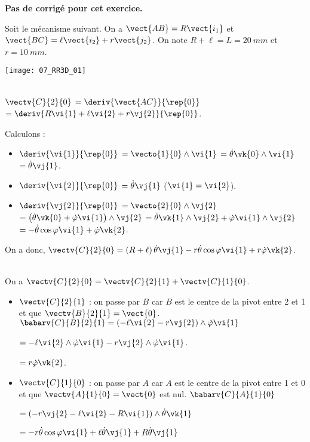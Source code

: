 \normaltrue \difficilefalse \tdifficilefalse
\correctiontrue


\setcounter{numques}{0}
\ifcorrection
\else
\textbf{Pas de corrigé pour cet exercice.}
\fi

\ifprof
\else
Soit le mécanisme suivant. On a $\vect{AB}=R\vect{i_1}$ et $\vect{BC}=\ell\vect{i_2}+r\vect{j_2}$. On note $R+\ell=L = \SI{20}{mm}$ et $r=\SI{10}{mm}$.
\begin{center}
\texttt{[image: 07\_RR3D\_01]}
\end{center}
\fi

\ifprof ~\\
$\vectv{C}{2}{0}$ 
$=\deriv{\vect{AC}}{\rep{0}}$ 
$=\deriv{R\vi{1}+\ell\vi{2}+r\vj{2}}{\rep{0}}$.

Calculons : 
\begin{itemize}
\item $\deriv{\vi{1}}{\rep{0}}$ $=\vecto{1}{0} \wedge \vi{1}$ $=\dot{\theta}\vk{0} \wedge \vi{1}$ $=\dot{\theta}\vj{1}$.
\item $\deriv{\vi{2}}{\rep{0}}$ $=\dot{\theta}\vj{1}$ ($\vi{1}=\vi{2}$).
\item $\deriv{\vj{2}}{\rep{0}}$ $=\vecto{2}{0} \wedge \vj{2}$ 
$=\left(\dot{\theta}\vk{0}+ \dot{\varphi}\vi{1} \right) \wedge \vj{2}$
$=\dot{\theta}\vk{1} \wedge \vj{2}+ \dot{\varphi}\vi{1}  \wedge \vj{2}$
$=-\dot{\theta}\cos\varphi \vi{1} + \dot{\varphi}\vk{2} $.
\end{itemize}

On a donc, 
$\vectv{C}{2}{0}= \left(R+\ell\right)\dot{\theta}\vj{1} -r\dot{\theta}\cos\varphi \vi{1} + r\dot{\varphi}\vk{2}$.
\else
\fi


\ifprof ~\\
On a $\vectv{C}{2}{0}= \vectv{C}{2}{1}+\vectv{C}{1}{0}$.
\begin{itemize}
\item $\vectv{C}{2}{1}$ : on passe par $B$ car $B$ est le centre de la pivot entre 2 et 1 et que $\vectv{B}{2}{1}=\vect{0}$. 
$\babarv{C}{B}{2}{1} =\left(-\ell\vi{2}-r\vj{2} \right)\wedge \dot{\varphi}\vi{1} $ 

$=-\ell\vi{2}\wedge \dot{\varphi}\vi{1}-r\vj{2} \wedge \dot{\varphi}\vi{1}$.

$=r\dot{\varphi}\vk{2}$.

\item $\vectv{C}{1}{0}$ : on passe par $A$ car $A$ est le centre de la pivot entre 1 et 0 et que $\vectv{A}{1}{0}=\vect{0}$ est nul. 
$\babarv{C}{A}{1}{0}$ 

$=\left(-r\vj{2}-\ell\vi{2}-R\vi{1}\right)\wedge \dot{\theta}\vk{1}$

$=-r\dot{\theta}\cos\varphi\vi{1}+\ell\dot{\theta}\vj{1}+R\dot{\theta}\vj{1}$ %
\end{itemize}

